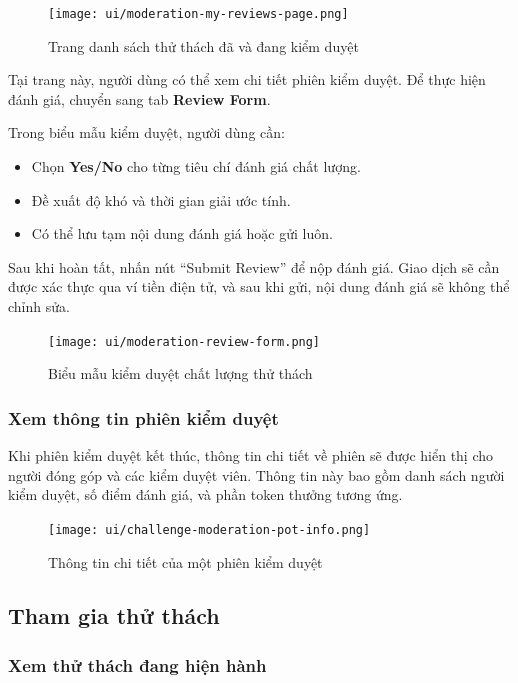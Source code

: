 \begin{figure}[H]
  \centering
  \texttt{[image: ui/moderation-my-reviews-page.png]}
  \caption{Trang danh sách thử thách đã và đang kiểm duyệt}
  \label{fig:moderation-my-reviews-page}
\end{figure}

Tại trang này, người dùng có thể xem chi tiết phiên kiểm duyệt.  
Để thực hiện đánh giá, chuyển sang tab \textbf{Review Form}.

Trong biểu mẫu kiểm duyệt, người dùng cần:
\begin{itemize}
  \item Chọn \textbf{Yes/No} cho từng tiêu chí đánh giá chất lượng.
  \item Đề xuất độ khó và thời gian giải ước tính.
  \item Có thể lưu tạm nội dung đánh giá hoặc gửi luôn.
\end{itemize}

Sau khi hoàn tất, nhấn nút ``Submit Review'' để nộp đánh giá.  
Giao dịch sẽ cần được xác thực qua ví tiền điện tử, và sau khi gửi, nội dung đánh giá sẽ không thể chỉnh sửa.

\begin{figure}[H]
  \centering
  \texttt{[image: ui/moderation-review-form.png]}
  \caption{Biểu mẫu kiểm duyệt chất lượng thử thách}
  \label{fig:moderation-review-form}
\end{figure}

\subsubsection{Xem thông tin phiên kiểm duyệt}

Khi phiên kiểm duyệt kết thúc, thông tin chi tiết về phiên sẽ được hiển thị cho người đóng góp và các kiểm duyệt viên.  
Thông tin này bao gồm danh sách người kiểm duyệt, số điểm đánh giá, và phần token thưởng tương ứng.

\begin{figure}[H]
  \centering
  \texttt{[image: ui/challenge-moderation-pot-info.png]}
  \caption{Thông tin chi tiết của một phiên kiểm duyệt}
  \label{fig:challenge-moderation-pot-info}
\end{figure}

\subsection{Tham gia thử thách}

\subsubsection{Xem thử thách đang hiện hành}

